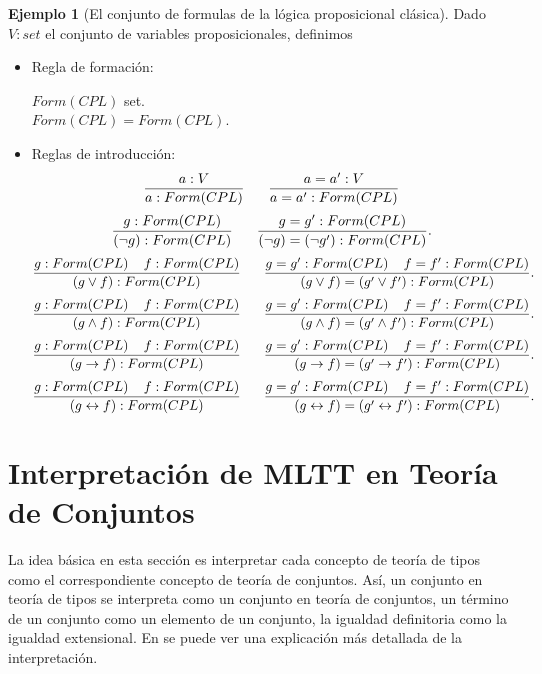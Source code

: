 \documentclass[11pt,oneside]{report}
\theoremstyle{plain}
\theoremstyle{definition}
\newtheorem{ejemplo}{Ejemplo}[chapter]
\begin{document}
\begin{ejemplo}[El conjunto de formulas de la lógica proposicional clásica]
    Dado $V :set$ el conjunto de variables proposicionales, definimos
    \begin{itemize}
        \item 
        Regla de formación:
        \begin{center}
            $Form(CPL)$ set.\\
            $Form(CPL)=Form(CPL)$.
        \end{center}
        \item Reglas de introducción:
        $$\frac{a:V}{a:Form(CPL)} \hspace{6mm} \frac{a=a':V}{a=a':Form(CPL)}$$
        $$\frac{g:Form(CPL)}{(\lnot g):Form(CPL)} \hspace{6mm} \frac{g=g':Form(CPL)}{(\lnot g)=(\lnot g'):Form(CPL)}.$$
        $$\frac{g:Form(CPL)\hspace{4mm}f:Form(CPL)}{(g\lor f):Form(CPL)} \hspace{6mm} \frac{g=g':Form(CPL)\hspace{4mm}f=f':Form(CPL)}{(g\lor f)=(g'\lor f'):Form(CPL)}.$$
        $$\frac{g:Form(CPL)\hspace{4mm}f:Form(CPL)}{(g\land f):Form(CPL)} \hspace{6mm} \frac{g=g':Form(CPL)\hspace{4mm}f=f':Form(CPL)}{(g\land f)=(g'\land f'):Form(CPL)}.$$
        $$\frac{g:Form(CPL)\hspace{4mm}f:Form(CPL)}{(g\rightarrow f):Form(CPL)} \hspace{6mm} \frac{g=g':Form(CPL)\hspace{4mm}f=f':Form(CPL)}{(g\rightarrow f)=(g'\rightarrow f'):Form(CPL)}.$$
        $$\frac{g:Form(CPL)\hspace{4mm}f:Form(CPL)}{(g\leftrightarrow f):Form(CPL)} \hspace{6mm} \frac{g=g':Form(CPL)\hspace{4mm}f=f':Form(CPL)}{(g\leftrightarrow f)=(g'\leftrightarrow f'):Form(CPL)}.$$
    \end{itemize}
\end{ejemplo}

\section{Interpretación de MLTT en Teoría de Conjuntos}

La idea básica en esta sección es interpretar cada concepto de teoría de tipos como el correspondiente concepto de teoría de conjuntos. Así, un conjunto en teoría de tipos se interpreta como un conjunto en teoría de conjuntos, un término de un conjunto como un elemento de un conjunto, la igualdad definitoria como la igualdad extensional. En \cite{Peter Dybjer} se puede ver una explicación más detallada de la interpretación.
\end{document}
